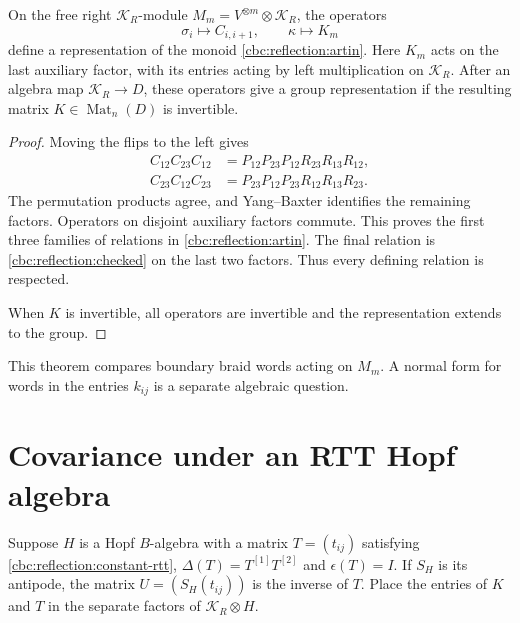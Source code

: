 \begin{theorem}\label{cbc:reflection:braid}
On the free right $\mathcal K_R$-module
$M_m=V^{\otimes m}\otimes\mathcal K_R$, the operators
\[
 \sigma_i\longmapsto C_{i,i+1},\qquad
 \kappa\longmapsto K_m
\]
define a representation of the monoid \eqref{cbc:reflection:artin}.
Here $K_m$ acts on the last auxiliary factor, with its entries acting by
left multiplication on $\mathcal K_R$.
After an algebra map $\mathcal K_R\to D$, these operators give a group
representation if the resulting matrix $K\in\operatorname{Mat}_n(D)$
is invertible.
\end{theorem}
\begin{proof}
Moving the flips to the left gives
\[
 \begin{aligned}
 C_{12}C_{23}C_{12}&=P_{12}P_{23}P_{12}R_{23}R_{13}R_{12},\\
 C_{23}C_{12}C_{23}&=P_{23}P_{12}P_{23}R_{12}R_{13}R_{23}.
 \end{aligned}
\]
The permutation products agree, and Yang--Baxter identifies the remaining
factors.  Operators on disjoint auxiliary factors commute.
This proves the first three families of relations in
\eqref{cbc:reflection:artin}.
The final relation is \eqref{cbc:reflection:checked} on the last two
factors.  Thus every defining relation is respected.

When $K$ is invertible, all operators are invertible and the representation
extends to the group.
\end{proof}

This theorem compares boundary braid words acting on $M_m$.
A normal form for words in the entries $k_{ij}$ is a separate algebraic
question.

\section{Covariance under an RTT Hopf algebra}
Suppose $H$ is a Hopf $B$-algebra with a matrix $T=(t_{ij})$ satisfying
\eqref{cbc:reflection:constant-rtt},
$\Delta(T)=T^{[1]}T^{[2]}$ and $\epsilon(T)=I$.
If $S_H$ is its antipode, the matrix $U=(S_H(t_{ij}))$ is the inverse of
$T$.  Place the entries of $K$ and $T$ in the separate factors of
$\mathcal K_R\otimes H$.

